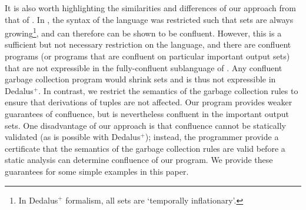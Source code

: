 It is also worth highlighting the similarities and differences of our approach from that of \cite{marczak2012confluence}.
In \cite{marczak2012confluence}, the syntax of the language was restricted such that sets are always growing\footnote{In Dedalus$^+$ formalism, all sets are `temporally inflationary'.}, and can therefore can be shown to be confluent.
However, this is a sufficient but not necessary restriction on the language, and there are confluent programs (or programs that are confluent on particular important output sets) that are not expressible in the fully-confluent sublanguage of \cite{marczak2012confluence}.
Any confluent garbage collection program would shrink sets and is thus not expressible in Dedalus$^+$.
In contrast, we restrict the semantics of the garbage collection rules to ensure that derivations of tuples are not affected.
Our program provides weaker guarantees of confluence, but is nevertheless confluent in the important output sets.
One disadvantage of our approach is that confluence cannot be statically validated (as is possible with Dedalus$^+$);
instead, the programmer provide a certificate that the semantics of the garbage collection rules are valid before a static analysis can determine confluence of our program.
We provide these guarantees for some simple examples in this paper.







